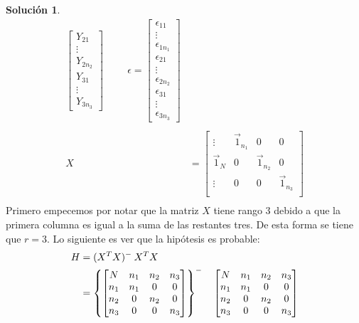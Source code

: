 \documentclass[12pt]{article}
\theoremstyle{plain}
\theoremstyle{definition}
\theoremstyle{definition}
\theoremstyle{definition}
\newtheorem*{solution}{Solución}
\begin{document}
\begin{solution}
\begin{align*}
\begin{bmatrix}
       Y_{21} \\ \vdots \\ Y_{2n_2}\\
       Y_{31} \\ \vdots \\ Y_{3n_3}
    \end{bmatrix} \hspace{1cm}
    \epsilon = \begin{bmatrix}
       \epsilon_{11} \\ \vdots \\ \epsilon_{1n_1} \\ \epsilon_{21} \\ \vdots \\ \epsilon_{2n_2} \\
       \epsilon_{31} \\ \vdots \\ \epsilon_{3n_3}
    \end{bmatrix} \\
    \\
    X &= \begin{bmatrix}
       \vdots & \Vec{1}_{n_1} & 0 &  0 \\
       \Vec{1}_N & 0 & \Vec{1}_{n_2} &  0 \\
       \vdots & 0 & 0 & \Vec{1}_{n_3} \\
    \end{bmatrix} \\
\end{align*}
Primero empecemos por notar que la matriz $X$ tiene rango $3$ debido a que la primera columna es igual a la suma de las restantes tres. De esta forma se tiene que $r=3$. Lo siguiente es ver que la hipótesis es probable:
\begin{align*}
H &= (X^TX)^-\:X^TX\\
&=\left\{\begin{bmatrix}
N   & n_1 & n_2 & n_3 \\
n_1 & n_1 & 0   & 0   \\
n_2 & 0   & n_2 & 0   \\
n_3 & 0   & 0   & n_3
\end{bmatrix}\right\}^- \hspace{0.35cm} \begin{bmatrix}
N   & n_1 & n_2 & n_3 \\
n_1 & n_1 & 0   & 0   \\
n_2 & 0   & n_2 & 0   \\
n_3 & 0   & 0   & n_3
\end{bmatrix}\\

\end{align*}
\end{solution}
\end{document}
